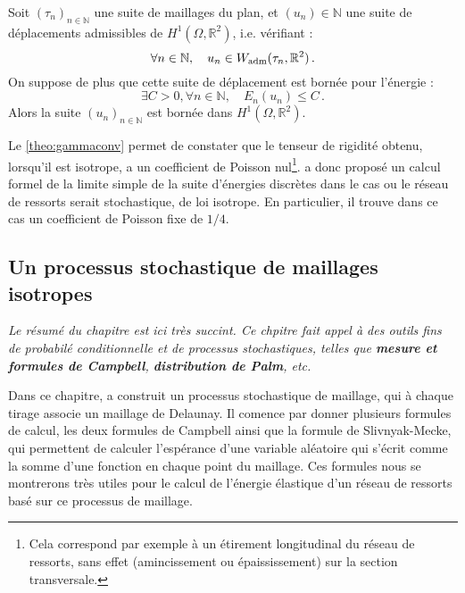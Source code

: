 \begin{theorem}
    Soit $(\tau_n)_{n\in\mathbb{N}}$ une suite de maillages du plan, et $(u_n) \in \mathbb{N}$ une suite de déplacements admissibles de $H^1(\Omega, \mathbb{R}^2)$, i.e. vérifiant :
    $$
        \forall n \in \mathbb{N}, \quad u_n \in W_{\text{\upshape adm}} (\tau_n, \mathbb{R}^2) \,.
    $$
    On suppose de plus que cette suite de déplacement est bornée pour l’énergie :
    $$
    \exists C > 0 , \forall n \in \mathbb{N}, \quad E_{n}(u_n) \leq C \,.
    $$
    Alors la suite $(u_n)_{n \in \mathbb{N}}$ est bornée dans $H^1(\Omega, \mathbb{R}^2)$.
\end{theorem}
\noindent Le \cref{theo:gammaconv} permet de constater que le tenseur de rigidité obtenu, lorsqu’il est isotrope, a un coefficient de Poisson nul\footnote{Cela correspond par exemple à un étirement longitudinal du réseau de ressorts, sans effet (amincissement ou épaississement) sur la section transversale.}. \citeauthor{balasoiu2020halthesis} a donc proposé un calcul formel de la limite simple de la suite d’énergies discrètes dans le cas ou le réseau de ressorts serait stochastique, de loi isotrope. En particulier, il trouve dans ce cas un coefficient de Poisson fixe de $1/4$.







\subsection{Un processus stochastique de maillages isotropes} 

\textit{Le résumé du chapitre \parencite[p.136]{balasoiu2020halthesis} est ici très succint. Ce chpitre fait appel à des outils fins de probabilé conditionnelle et de processus stochastiques, telles que \textbf{mesure et formules de Campbell}, \textbf{distribution de Palm}, etc. }

Dans ce chapitre, \citeauthor{balasoiu2020halthesis} a construit un processus stochastique de maillage, qui à chaque tirage associe un maillage de Delaunay. Il comence par donner plusieurs formules de calcul, les deux formules de Campbell ainsi que la formule de Slivnyak-Mecke, qui permettent de calculer l’espérance d’une variable aléatoire qui s’écrit comme la somme d’une fonction en chaque point du maillage. Ces formules nous se montrerons très utiles pour le calcul de l’énergie élastique d’un réseau de ressorts basé sur ce processus de maillage.


